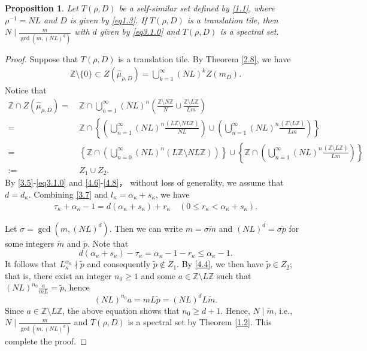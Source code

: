 \documentclass[11pt]{article}
\newtheorem{proposition}[theorem]{Proposition}
\numberwithin{equation}{section}
\begin{document}
\begin{proposition}\label{prop6.2}
Let $T(\rho,D)$ be a self-similar set defined by \eqref{1.1}, where $\rho^{-1}=NL$ and $D$ is given by \eqref{eq1.3}.
	If $T(\rho,D)$ is a translation tile, then $N\mid\frac{m}{\gcd(m,(NL)^d)}$ with $d$ given by \eqref{eq3.1.0} and $T(\rho,D)$ is a spectral set.
\end{proposition}
\begin{proof}
Suppose that $T(\rho,D)$ is  a translation tile. By Theorem \ref{2.8}, we have
\begin{align}\label{4.4}
	\mathbb{Z} \setminus \{0\} \subset Z(\hat{\mu}_{\rho,D})=\bigcup^{\infty}_{k=1}(NL)^kZ(m_D).
\end{align}
Notice that
\begin{align*}
	 \mathbb{Z} \cap Z(\hat{\mu}_{\rho,D})=&~ \mathbb{Z} \cap \bigcup^{\infty}_{n=1} (NL)^n \left(\frac{\mathbb{Z} \setminus N\mathbb{Z}}{N} \cup \frac{\mathbb{Z} \setminus L\mathbb{Z}}{Lm}\right)   \\
	=&~ \mathbb{Z} \cap\left\{\left(\bigcup^{\infty}_{n=1} (NL)^n \frac{(L\mathbb{Z} \setminus NL\mathbb{Z})}{NL}\right) \cup  \left(\bigcup^{\infty}_{n=1}(NL)^n \frac{(\mathbb{Z} \setminus L\mathbb{Z})}{Lm}\right)\right\}   \\
	=&~ \left\{\mathbb{Z} \cap\left(\bigcup^{\infty}_{n=0} (NL)^n (L\mathbb{Z} \setminus NL\mathbb{Z})\right) \right\}\cup  \left\{\mathbb{Z} \cap \left(\bigcup^{\infty}_{n=1}(NL)^n \frac{(\mathbb{Z} \setminus L\mathbb{Z})}{Lm}\right)\right\}\\
	:=&~Z_1\cup Z_2.
\end{align*}
By \eqref{3.5}-\eqref{eq3.1.0} and \eqref{4.6}-\eqref{4.8}，
without loss of generality, we assume that $d=d_\kappa$. Combining  \eqref{3.7} and $l_{\kappa}=\alpha_\kappa+s_\kappa$, we have
\begin{align*}
	\tau_\kappa + \alpha_\kappa - 1 = d (\alpha_\kappa+s_\kappa) + r_\kappa \quad (0 \leq r_\kappa< \alpha_\kappa+s_\kappa).
\end{align*}

Let $\sigma = \gcd(m, (NL)^d)$. Then we can write $m = \sigma \tilde{m}$ and  $(NL)^d = \sigma \tilde{p}$ for some integers   $\tilde{m}$ and $\tilde{p}$.
Note that
$$d (\alpha_\kappa+s_\kappa)-\tau_\kappa=\alpha_\kappa - 1-r_\kappa\leq \alpha_\kappa - 1.$$
It follows that $L_\kappa^{\alpha_\kappa}\nmid \tilde{p}$ and consequently $\tilde{p}\notin Z_1$. By \eqref{4.4}, we then have $\tilde{p}\in Z_2$; that is, there exist an integer $n_0\geq 1$ and some $a\in \mathbb{Z} \setminus L\mathbb{Z}$ such that
 $(NL)^{n_0}\frac{a}{mL}=\tilde{p}$, hence
$$
(NL)^{n_0} a=mL\tilde{p}=(NL)^d L \tilde{m}.
$$
Since $a\in \mathbb{Z} \setminus L\mathbb{Z}$, the above equation shows that $n_0\geq d+1$. Hence, $N\mid\tilde{m}$, i.e.,
$N\mid\frac{m}{\gcd(m,(NL)^d)}$  and $T(\rho,D)$ is a spectral set by Theorem \ref{1.2}. This complete the proof.
\end{proof}
\end{document}
